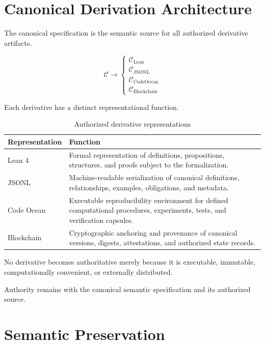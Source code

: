 \documentclass[11pt]{article}
\newcommand{\Spec}{\mathcal{C}}
\begin{document}
\section{Canonical Derivation Architecture}

The canonical specification is the semantic source for all
authorized derivative artifacts.

\[
\boxed{
\Spec
\longrightarrow
\begin{cases}
\Spec_{\mathrm{Lean}}\\
\Spec_{\mathrm{JSONL}}\\
\Spec_{\mathrm{CodeOcean}}\\
\Spec_{\mathrm{Blockchain}}
\end{cases}
}
\]

Each derivative has a distinct representational function.

\begin{table}[h]
\centering
\begin{tabular}{p{}p{}}
\toprule
\textbf{Representation} & \textbf{Function}\\
\midrule
Lean 4 &
Formal representation of definitions, propositions, structures,
and proofs subject to the formalization.\\[0.5em]

JSONL &
Machine-readable serialization of canonical definitions,
relationships, examples, obligations, and metadata.\\[0.5em]

Code Ocean &
Executable reproducibility environment for defined computational
procedures, experiments, tests, and verification capsules.\\[0.5em]

Blockchain &
Cryptographic anchoring and provenance of canonical versions,
digests, attestations, and authorized state records.\\
\bottomrule
\end{tabular}
\caption{Authorized derivative representations}
\end{table}

No derivative becomes authoritative merely because it is
executable, immutable, computationally convenient, or externally
distributed.

Authority remains with the canonical semantic specification and
its authorized source.

\section{Semantic Preservation}
\end{document}
